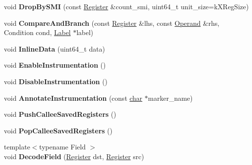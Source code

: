 \begin{DoxyCompactItemize}
void {\bfseries Drop\+By\+S\+MI} (const \mbox{\hyperlink{classv8_1_1internal_1_1Register}{Register}} \&count\+\_\+smi, uint64\+\_\+t unit\+\_\+size=k\+X\+Reg\+Size)
\item 
\mbox{\label{classv8_1_1internal_1_1MacroAssembler_a33c79f371a9d1f65c4719115bcb7d119}} 
void {\bfseries Compare\+And\+Branch} (const \mbox{\hyperlink{classv8_1_1internal_1_1Register}{Register}} \&lhs, const \mbox{\hyperlink{classv8_1_1internal_1_1Operand}{Operand}} \&rhs, Condition cond, \mbox{\hyperlink{classv8_1_1internal_1_1Label}{Label}} $\ast$label)
\item 
\mbox{\label{classv8_1_1internal_1_1MacroAssembler_a6b5766843067a026d95270e5f26f72fd}} 
void {\bfseries Inline\+Data} (uint64\+\_\+t data)
\item 
\mbox{\label{classv8_1_1internal_1_1MacroAssembler_a952bc4654525580d1d215f71b41e8790}} 
void {\bfseries Enable\+Instrumentation} ()
\item 
\mbox{\label{classv8_1_1internal_1_1MacroAssembler_a9110deb87cb88f6e69629053556d6176}} 
void {\bfseries Disable\+Instrumentation} ()
\item 
\mbox{\label{classv8_1_1internal_1_1MacroAssembler_a11f88c311b40a3a9f16334f6cc6bb46c}} 
void {\bfseries Annotate\+Instrumentation} (const \mbox{\hyperlink{classchar}{char}} $\ast$marker\+\_\+name)
\item 
\mbox{\label{classv8_1_1internal_1_1MacroAssembler_a50e6e0893cdc8f1acc9c0d3d65198e5d}} 
void {\bfseries Push\+Callee\+Saved\+Registers} ()
\item 
\mbox{\label{classv8_1_1internal_1_1MacroAssembler_adc79158958789999aa0d0a3182104eb5}} 
void {\bfseries Pop\+Callee\+Saved\+Registers} ()
\item 
\mbox{\label{classv8_1_1internal_1_1MacroAssembler_a255a40c7f619cdf00e2b66de3afaf6f1}} 
{\footnotesize template$<$typename Field $>$ }\\void {\bfseries Decode\+Field} (\mbox{\hyperlink{classv8_1_1internal_1_1Register}{Register}} dst, \mbox{\hyperlink{classv8_1_1internal_1_1Register}{Register}} src)

\end{DoxyCompactItemize}
